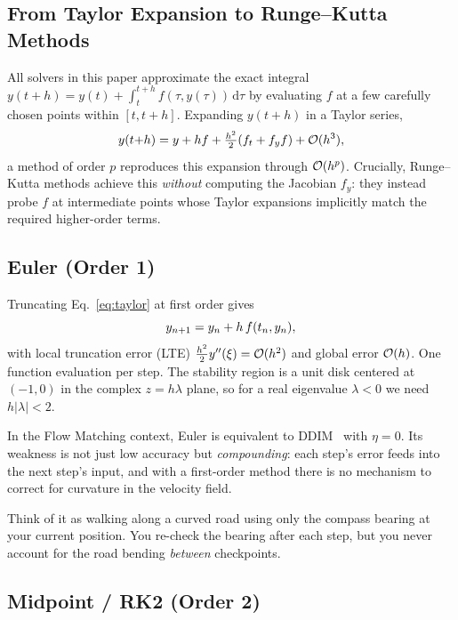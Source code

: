 \documentclass[11pt]{article}
\begin{document}
\subsection{From Taylor Expansion to Runge--Kutta Methods}
\label{sec:taylor-to-rk}

All solvers in this paper approximate the exact integral
$y(t{+}h) = y(t) + \int_t^{t+h}\!f(\tau,y(\tau))\,\mathrm{d}\tau$
by evaluating $f$ at a few carefully chosen points within $[t,t{+}h]$.
Expanding $y(t{+}h)$ in a Taylor series,
\begin{equation}
\label{eq:taylor}
y(t{+}h) = y + hf + \tfrac{h^2}{2}(f_t + f_y f) + \mathcal{O}(h^3),
\end{equation}
a method of order $p$ reproduces this expansion through $\mathcal{O}(h^p)$.
Crucially, Runge--Kutta methods achieve this \emph{without}
computing the Jacobian $f_y$: they instead probe $f$ at
intermediate points whose Taylor expansions implicitly match the
required higher-order terms.

\subsection{Euler (Order 1)}
\label{sec:euler}

Truncating Eq.~\eqref{eq:taylor} at first order gives
\begin{equation}
\label{eq:euler}
y_{n+1} = y_n + h\,f(t_n,y_n),
\end{equation}
with local truncation error (LTE) $\frac{h^2}{2}y''(\xi)=\mathcal{O}(h^2)$
and global error $\mathcal{O}(h)$.  One function evaluation per step.
The stability region is a unit disk centered at $(-1,0)$ in the
complex $z=h\lambda$ plane, so for a real eigenvalue $\lambda<0$
we need $h|\lambda|<2$.

In the Flow Matching context, Euler is equivalent to
DDIM~\citep{song2021denoising} with $\eta=0$.
Its weakness is not just low accuracy but \emph{compounding}:
each step's error feeds into the next step's input, and with a
first-order method there is no mechanism to correct for curvature
in the velocity field.

Think of it as walking along a curved road using only the
compass bearing at your current position.  You re-check the
bearing after each step, but you never account for the road
bending \emph{between} checkpoints.

\subsection{Midpoint / RK2 (Order 2)}
\label{sec:midpoint}
\end{document}
